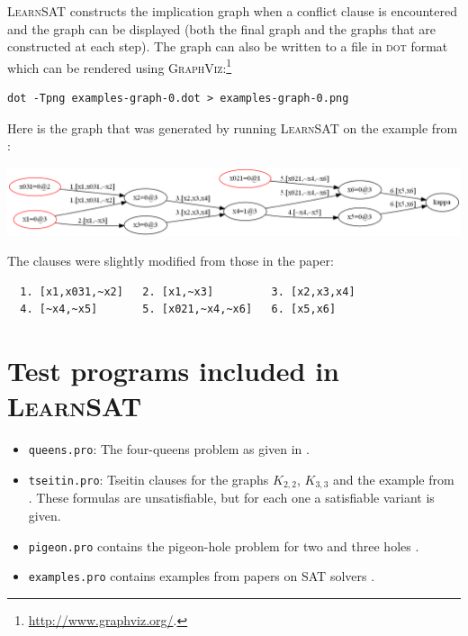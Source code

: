 \documentclass[11pt]{article}
\newcommand*{\p}[1]{\textup{\texttt{#1}}}
\newcommand*{\ls}{\textsc{LearnSAT}}
\newcommand*{\dt}{\textsc{dot}}
\begin{document}
\ls{} constructs the implication graph when a conflict clause is
encountered and the graph can be displayed (both the final graph and the
graphs that are constructed at each step). The graph can also be written
to a file in \dt{} format which can be rendered using
\textsc{GraphViz}:\footnote{\url{http://www.graphviz.org/}.}

\begin{verbatim}
dot -Tpng examples-graph-0.dot > examples-graph-0.png
\end{verbatim}

\pagebreak[3]

Here is the graph that was generated by running \ls{} on the example
from \cite{mlm}:
\begin{center}
\includegraphics[keepaspectratio=true,width=\textwidth]{graph}
\end{center}
The clauses were slightly modified from those in the paper:
\begin{verbatim}
  1. [x1,x031,~x2]   2. [x1,~x3]         3. [x2,x3,x4]
  4. [~x4,~x5]       5. [x021,~x4,~x6]   6. [x5,x6]
\end{verbatim}

\section{Test programs included in \ls{}}

\begin{itemize}

\item \p{queens.pro}: The four-queens problem as given in
\cite[Section 6.4]{mlcs}.

\item \p{tseitin.pro}: Tseitin clauses for the graphs $K_{2,2}$,
$K_{3,3}$ and the example from \cite[Section 4.5]{mlcs}. These formulas
are unsatisfiable, but for each one a satisfiable variant is given.

\item \p{pigeon.pro} contains the pigeon-hole problem for
two and three holes \cite[Exercise 6.4]{mlcs}.

\item \p{examples.pro} contains examples from papers on SAT
solvers \cite{mz,mlm,ms}.
\end{itemize}
\end{document}
